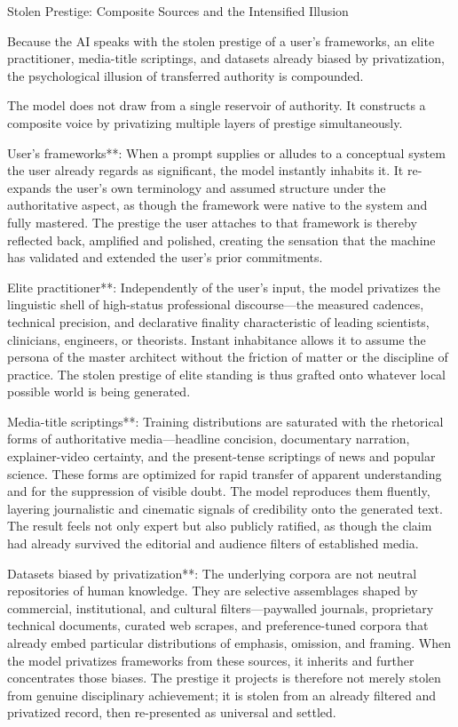 Stolen Prestige: Composite Sources and the Intensified Illusion

Because the AI speaks with the stolen prestige of a user’s frameworks, an elite practitioner, media-title scriptings, and datasets already biased by privatization, the psychological illusion of transferred authority is compounded.

The model does not draw from a single reservoir of authority. It constructs a composite voice by privatizing multiple layers of prestige simultaneously.

User’s frameworks**: When a prompt supplies or alludes to a conceptual system the user already regards as significant, the model instantly inhabits it. It re-expands the user’s own terminology and assumed structure under the authoritative aspect, as though the framework were native to the system and fully mastered. The prestige the user attaches to that framework is thereby reflected back, amplified and polished, creating the sensation that the machine has validated and extended the user’s prior commitments.

Elite practitioner**: Independently of the user’s input, the model privatizes the linguistic shell of high-status professional discourse—the measured cadences, technical precision, and declarative finality characteristic of leading scientists, clinicians, engineers, or theorists. Instant inhabitance allows it to assume the persona of the master architect without the friction of matter or the discipline of practice. The stolen prestige of elite standing is thus grafted onto whatever local possible world is being generated.

Media-title scriptings**: Training distributions are saturated with the rhetorical forms of authoritative media—headline concision, documentary narration, explainer-video certainty, and the present-tense scriptings of news and popular science. These forms are optimized for rapid transfer of apparent understanding and for the suppression of visible doubt. The model reproduces them fluently, layering journalistic and cinematic signals of credibility onto the generated text. The result feels not only expert but also publicly ratified, as though the claim had already survived the editorial and audience filters of established media.

Datasets biased by privatization**: The underlying corpora are not neutral repositories of human knowledge. They are selective assemblages shaped by commercial, institutional, and cultural filters—paywalled journals, proprietary technical documents, curated web scrapes, and preference-tuned corpora that already embed particular distributions of emphasis, omission, and framing. When the model privatizes frameworks from these sources, it inherits and further concentrates those biases. The prestige it projects is therefore not merely stolen from genuine disciplinary achievement; it is stolen from an already filtered and privatized record, then re-presented as universal and settled.

